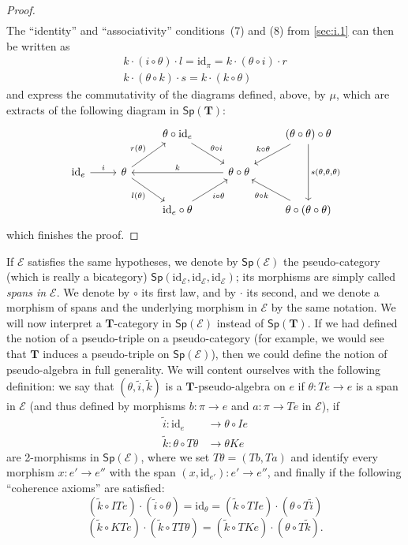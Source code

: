 \documentclass[fleqn]{article}
\newcommand{\oldpage}[1]{\marginpar{\footnotesize$\Big\vert$ \textit{p.~#1}}}
\newcommand{\id}{\mathrm{id}}
\newcommand{\TT}{\mathbf{T}}
\newcommand{\cat}[1]{\mathcal{#1}}
\newcommand{\Cat}[1]{\mathsf{#1}}
\newcommand{\Sp}[1]{\Cat{Sp}(#1)}
\begin{document}
\begin{proof}
\[\begin{aligned}
    \end{aligned}
  \]
  The ``identity'' and ``associativity'' conditions~(7) and (8) from \cref{sec:i.1} can then be written as
  \[
    \begin{gathered}
      k\cdot(i\circ\theta)\cdot l
      = \id_\pi
      = k\cdot(\theta\circ i)\cdot r
    \\k\cdot(\theta\circ k)\cdot s
      = k\cdot(k\circ\theta)
    \end{gathered}
  \]
  and express the commutativity of the diagrams defined, above, by $\mu$, which are extracts of the following diagram in $\Sp{\TT}$:
  \[
    \begin{tikzcd}
      &&\theta\circ\id_e
        \ar[dr,"\theta\circ i"]
      &&(\theta\circ\theta)\circ\theta
        \ar[dl,swap,"k\circ\theta"]
        \ar[dd,"{s(\theta,\theta,\theta)}"]
    \\\id_e
        \ar[r,"i"]
      & \theta
        \ar[ur,"r(\theta)"]
        \ar[dr,swap,"l(\theta)"]
      && \theta\circ\theta
        \ar[ll,swap,"k"]
    \\&&\id_e\circ\theta
        \ar[ur,swap,"i\circ\theta"]
      &&\theta\circ(\theta\circ\theta)
        \ar[ul,"\theta\circ k"]
    \end{tikzcd}
  \]
  \oldpage{260}
  which finishes the proof.
\end{proof}

If $\cat{E}$ satisfies the same hypotheses, we denote by $\Sp{\cat{E}}$ the pseudo-category (which is really a bicategory) $\Sp{\id_\cat{E},\id_\cat{E},\id_\cat{E}}$;
its morphisms are simply called \emph{spans in $\cat{E}$}.
We denote by $\circ$ its first law, and by $\cdot$ its second, and we denote a morphism of spans and the underlying morphism in $\cat{E}$ by the same notation.
We will now interpret a $\TT$-category in $\Sp{\cat{E}}$ instead of $\Sp{\TT}$.
If we had defined the notion of a pseudo-triple on a pseudo-category (for example, we would see that $\TT$ induces a pseudo-triple on $\Sp{\cat{E}}$), then we could define the notion of pseudo-algebra in full generality.
We will content ourselves with the following definition: we say that $(\theta,\tilde{i},\tilde{k})$ is a $\TT$-pseudo-algebra on $e$ if $\theta\colon Te\to e$ is a span in $\cat{E}$ (and thus defined by morphisms $b\colon\pi\to e$ and $a\colon\pi\to Te$ in $\cat{E}$), if
\[
  \begin{aligned}
    \tilde{i}\colon \id_e
    &\to \theta\circ Ie
  \\\tilde{k}\colon \theta\circ T\theta
    &\to \theta Ke
  \end{aligned}
\]
are 2-morphisms in $\Sp{\cat{E}}$, where we set $T\theta=(Tb,Ta)$ and identify every morphism $x\colon e'\to e''$ with the span $(x,\id_{e'})\colon e'\to e''$, and finally if the following ``coherence axioms'' are satisfied:
\[
  (\tilde{k}\circ ITe)\cdot(\tilde{i}\circ\theta)
  = \id_\theta
  = (\tilde{k}\circ TIe)\cdot(\theta\circ T\tilde{i})
  \tag{1}
\]
\[
  (\tilde{k}\circ KTe)\cdot(\tilde{k}\circ TT\theta)
  = (\tilde{k}\circ TKe)\cdot(\theta\circ T\tilde{k}).
  \tag{2}
\]
\end{document}
